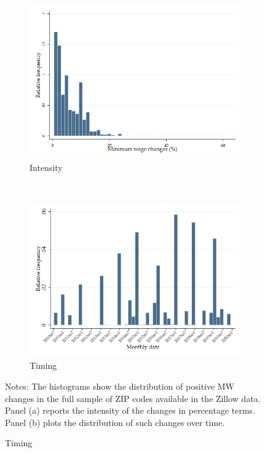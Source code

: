 \begin{figure}[h!]
    \centering
    \caption{Distribution of Minimum Wage Changes}
    \label{fig:mw_changes_dist}

    \begin{subfigure}{.7\textwidth}
        \caption{Intensity}
        \includegraphics[width = \textwidth]
            {descriptive/estimation_samples/output/pct_ch_mw_dist}
    \end{subfigure}\\
    \begin{subfigure}{.7\textwidth}
        \caption{Timing}
        \includegraphics[width = \textwidth]
            {descriptive/estimation_samples/output/pct_ch_mw_date_dist}
    \end{subfigure}

    \begin{minipage}{.95\textwidth} \footnotesize
        \vspace{3mm}
        Notes:
        The histograms show the distribution of positive MW changes in the full 
        sample of ZIP codes available in the Zillow data.
        Panel (a) reports the intensity of the changes in percentage terms.
        Panel (b) plots the distribution of such changes over time.
    \end{minipage}
\end{figure}
